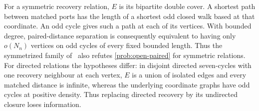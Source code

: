 \begin{remark}
\label{rem:dc-comparison}
For a symmetric recovery relation, $E$ is its bipartite double cover.
A shortest path between matched ports has the length of a shortest odd
closed walk based at that coordinate. An odd
cycle gives such a path at each of its vertices.  With bounded degree,
paired-distance separation is consequently equivalent to having only $o(N_n)$
vertices on odd cycles of every fixed bounded length.
Thus the symmetrized family of~\cite[Corollary~U]{StorageCodes2026}
also refutes \cref{prob:open-paired} for symmetric relations.
For directed relations the hypotheses differ: in disjoint directed
seven-cycles with one recovery neighbour at each vertex, $E$ is a union
of isolated edges and every matched distance is infinite, whereas the
underlying coordinate graphs have odd cycles at positive density.
Thus replacing directed recovery by its undirected closure loses information.
\end{remark}
